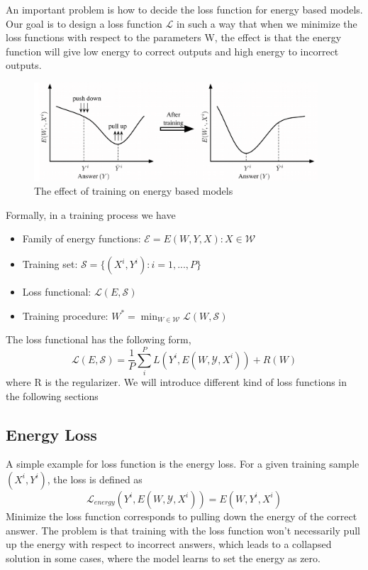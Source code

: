 An important problem is how to decide the loss function for energy based models.
Our goal is to design a loss function $\mathcal{L}$ in such a way that
when we minimize the loss functions with respect to the parameters W,
the effect is that the energy function will give low energy to correct outputs 
and high energy to incorrect outputs.\\

\begin{figure}[!ht]
    \centering
    \includegraphics[width=300pt]{figs/ebm_train.png}
    \caption{The effect of training on energy based models}
    \label{fig:energy_based_models_training}
\end{figure}

Formally, in a training process we have
\begin{itemize}
    \item Family of energy functions: $\mathcal{E} = {E(W,Y,X):X \in \mathcal{W}}$
    \item Training set: $\mathcal{S} = \{(X^i, Y^i): i = 1,...,P \}$
    \item Loss functional: $\mathcal{L}(E, \mathcal{S})$
    \item Training procedure: $W^* = \min_{W \in \mathcal{W}} \mathcal{L}(W, \mathcal{S})$
\end{itemize}

The loss functional has the following form,
\[
    \mathcal{L}(E, \mathcal{S}) = \frac{1}{P} \sum_i^P L(Y^i, E(W, \mathcal{Y},X^i)) + R(W)    
\]
where R is the regularizer. We will introduce different kind of loss functions
in the following sections\\


\subsection{Energy Loss}

A simple example for loss function is the energy loss. For a given training sample
$(X^i,Y^i)$, the loss is defined as
\[
    \mathcal{L}_{energy}(Y^i, E(W, \mathcal{Y}, X^i)) = E(W, Y^i, X^i)    
\]
Minimize the loss function corresponds to pulling down the energy of 
the correct answer. The problem is that training with the loss function won't
necessarily pull up the energy with respect to incorrect answers, which 
leads to a collapsed solution in some cases, 
where the model learns to set the energy as zero. 

